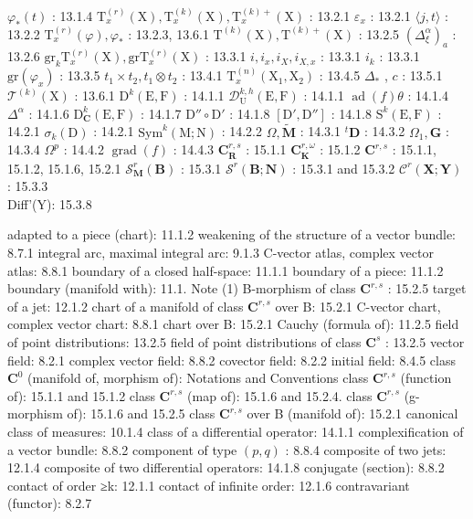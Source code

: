 \(\varphi_{*}(t)\) : 13.1.4 \(\mathrm{T}_x^{(r)}(\mathrm{X}), \mathrm{T}_x^{(k)}(\mathrm{X}), \mathrm{T}_x^{(k)+}(\mathrm{X})\) : 13.2.1 \(\varepsilon_x\) : 13.2.1 \(\langle j, t \rangle\) : 13.2.2 \(\mathrm{T}_x^{(r)}(\varphi), \varphi_*\) : 13.2.3, 13.6.1 \(\mathrm{T}^{(k)}(\mathrm{X}), \mathrm{T}^{(k)+}(\mathrm{X})\) : 13.2.5 \((\Delta_{\xi}^{\alpha})_a\) : 13.2.6 \(\mathrm{gr}_k \mathrm{T}_x^{(r)}(\mathrm{X}), \mathrm{gr} \mathrm{T}_x^{(r)}(\mathrm{X})\) : 13.3.1 \(i, i_x, i_X, i_{X,x}\) : 13.3.1 \(i_k\) : 13.3.1 \(\mathrm{gr}(\varphi_x)\) : 13.3.5 \(t_1 \times t_2, t_1 \otimes t_2\) : 13.4.1 \(\mathrm{T}_x^{(n)}(\mathrm{X}_1, \mathrm{X}_2)\) : 13.4.5 \(\Delta_*\) , \(c\) : 13.5.1 \(\mathcal{T}^{(k)}(\mathrm{X})\) : 13.6.1 \(\mathrm{D}^k (\mathrm{E}, \mathrm{F})\) : 14.1.1 \(\mathcal{D}_{\mathrm{U}}^{k,h}(\mathrm{E}, \mathrm{F})\) : 14.1.1 \(\operatorname{ad}(f)\theta\) : 14.1.4 \(\Delta^\alpha\) : 14.1.6 \(\mathrm{D}_{\mathbf{C}}^{k}(\mathrm{E}, \mathrm{F})\) : 14.1.7 \(\mathrm{D}'' \circ \mathrm{D}'\) : 14.1.8 \([\mathrm{D}' , \mathrm{D}'']\) : 14.1.8 \(\mathrm{S}^k (\mathrm{E}, \mathrm{F})\) : 14.2.1 \(\sigma_k (\mathrm{D})\) : 14.2.1 \(\mathrm{Sym}^k (\mathrm{M}; \mathrm{N})\) : 14.2.2 \(\Omega, \tilde{\mathbf{M}}\) : 14.3.1 \(^t\mathbf{D}\) : 14.3.2 \(\Omega_1, \mathbf{G}\) : 14.3.4 \(\Omega^p\) : 14.4.2 \(\operatorname{grad}(f)\) : 14.4.3 \(\mathbf{C}_{\mathbf{R}}^{r,s}\) : 15.1.1 \(\mathbf{C}_{\mathbf{K}}^{r,\omega}\) : 15.1.2 \(\mathbf{C}^{r,s}\) : 15.1.1, 15.1.2, 15.1.6, 15.2.1 \(\mathcal{S}_{\mathbf{M}}^r (\mathbf{B})\) : 15.3.1 \(\mathcal{S}^r (\mathbf{B}; \mathbf{N})\) : 15.3.1 and 15.3.2 \(\mathcal{C}^r (\mathbf{X}; \mathbf{Y})\) : 15.3.3\\
Diff'(Y): 15.3.8


adapted to a piece (chart): 11.1.2 weakening of the structure of a vector bundle: 8.7.1 integral arc, maximal integral arc: 9.1.3 C-vector atlas, complex vector atlas: 8.8.1 boundary of a closed half-space: 11.1.1 boundary of a piece: 11.1.2 boundary (manifold with): 11.1. Note (1) B-morphism of class \(\mathbf{C}^{r,s}\) : 15.2.5 target of a jet: 12.1.2 chart of a manifold of class \(\mathbf{C}^{r,s}\) over B: 15.2.1 C-vector chart, complex vector chart: 8.8.1 chart over B: 15.2.1 Cauchy (formula of): 11.2.5 field of point distributions: 13.2.5 field of point distributions of class \(\mathbf{C}^s\) : 13.2.5 vector field: 8.2.1 complex vector field: 8.8.2 covector field: 8.2.2 initial field: 8.4.5 class \(\mathbf{C}^0\) (manifold of, morphism of): Notations and Conventions class \(\mathbf{C}^{r,s}\) (function of): 15.1.1 and 15.1.2 class \(\mathbf{C}^{r,s}\) (map of): 15.1.6 and 15.2.4. class \(\mathbf{C}^{r,s}\) (g-morphism of): 15.1.6 and 15.2.5 class \(\mathbf{C}^{r,s}\) over B (manifold of): 15.2.1 canonical class of measures: 10.1.4 class of a differential operator: 14.1.1 complexification of a vector bundle: 8.8.2 component of type \((p,q)\) : 8.8.4 composite of two jets: 12.1.4 composite of two differential operators: 14.1.8 conjugate (section): 8.8.2 contact of order ≥k: 12.1.1 contact of infinite order: 12.1.6 contravariant (functor): 8.2.7

